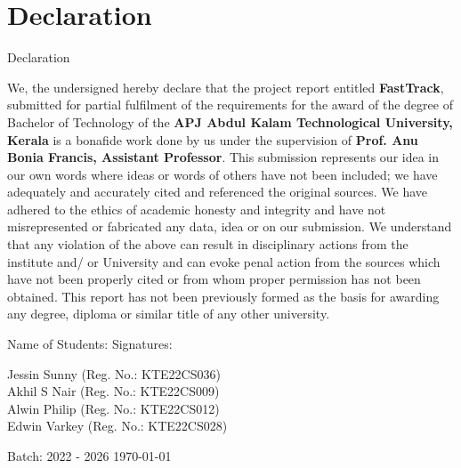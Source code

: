 \newpage
\thispagestyle{empty}
\chapter*{Declaration}
{\numberline{}Declaration}%

\hspace{20pt}We, the undersigned hereby declare that the project report entitled \textbf{FastTrack}, submitted for partial fulfilment of the requirements for the award of the degree of Bachelor of Technology of the \textbf{APJ Abdul Kalam Technological University, Kerala} is a bonafide work done by us under the supervision of \textbf{Prof. Anu Bonia Francis, Assistant Professor}. This submission represents our idea in our own words where ideas or words of others have not been included; we have adequately and accurately cited and referenced the original sources. We have adhered to the ethics of academic honesty and integrity and have not misrepresented or fabricated any data, idea or on our submission. We understand that any violation of the above can result in disciplinary actions from the institute and/ or University and can evoke penal action from the sources which have not been properly cited or from whom proper permission has not been obtained. This report has not been previously formed as the basis for awarding any degree, diploma or similar title of any other university.
\vspace{50pt}
\begin{flushleft}
Name of Students:\hspace{250pt} Signatures:\\
\vspace{15pt}
\begin{spacing}{1.5}{
\hspace{20pt}Jessin Sunny (Reg. No.: KTE22CS036)\\
\hspace{20pt}Akhil S Nair (Reg. No.: KTE22CS009)\\
\hspace{20pt}Alwin Philip (Reg. No.: KTE22CS012)\\
\hspace{20pt}Edwin Varkey (Reg. No.: KTE22CS028)\\
}
\end{spacing}
\vspace{15pt}
Batch: 2022 - 2026 \hfill \today
\end{flushleft}
